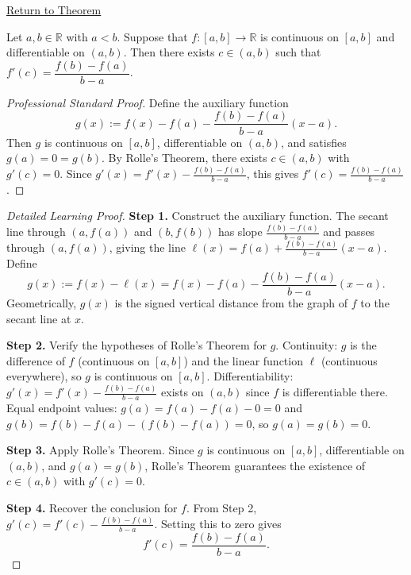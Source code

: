 \newpage
{}
\label{prf:mean-value-theorem}

\begin{remark*}[Return]
\hyperref[thm:mean-value-theorem]{Return to Theorem}
\end{remark*}

\begin{theorem*}
Let $a, b \in \mathbb{R}$ with $a < b$. Suppose that $f : [a,b] \to \mathbb{R}$ is continuous on $[a,b]$ and differentiable on $(a,b)$. Then there exists $c \in (a,b)$ such that $f'(c) = \dfrac{f(b)-f(a)}{b-a}$.
\end{theorem*}

\begin{proof}[Professional Standard Proof]
\LRAProofBodyStart
Define the auxiliary function
\[
g(x) := f(x) - f(a) - \frac{f(b)-f(a)}{b-a}(x-a).
\]
Then $g$ is continuous on $[a,b]$, differentiable on $(a,b)$, and satisfies $g(a) = 0 = g(b)$. By Rolle's Theorem, there exists $c \in (a,b)$ with $g'(c) = 0$. Since $g'(x) = f'(x) - \tfrac{f(b)-f(a)}{b-a}$, this gives $f'(c) = \tfrac{f(b)-f(a)}{b-a}$.
\end{proof}

\begin{proof}[Detailed Learning Proof]
\LRAProofBodyStart

\textbf{Step 1.} Construct the auxiliary function. The secant line through $(a, f(a))$ and $(b, f(b))$ has slope $\tfrac{f(b)-f(a)}{b-a}$ and passes through $(a, f(a))$, giving the line $\ell(x) = f(a) + \tfrac{f(b)-f(a)}{b-a}(x-a)$. Define
\[
g(x) := f(x) - \ell(x) = f(x) - f(a) - \frac{f(b)-f(a)}{b-a}(x-a).
\]
Geometrically, $g(x)$ is the signed vertical distance from the graph of $f$ to the secant line at $x$.

\textbf{Step 2.} Verify the hypotheses of Rolle's Theorem for $g$. Continuity: $g$ is the difference of $f$ (continuous on $[a,b]$) and the linear function $\ell$ (continuous everywhere), so $g$ is continuous on $[a,b]$. Differentiability: $g'(x) = f'(x) - \tfrac{f(b)-f(a)}{b-a}$ exists on $(a,b)$ since $f$ is differentiable there. Equal endpoint values: $g(a) = f(a) - f(a) - 0 = 0$ and $g(b) = f(b) - f(a) - (f(b)-f(a)) = 0$, so $g(a) = g(b) = 0$.

\textbf{Step 3.} Apply Rolle's Theorem. Since $g$ is continuous on $[a,b]$, differentiable on $(a,b)$, and $g(a) = g(b)$, Rolle's Theorem guarantees the existence of $c \in (a,b)$ with $g'(c) = 0$.

\textbf{Step 4.} Recover the conclusion for $f$. From Step 2, $g'(c) = f'(c) - \tfrac{f(b)-f(a)}{b-a}$. Setting this to zero gives
\[
f'(c) = \frac{f(b)-f(a)}{b-a}.
\]
\end{proof}

